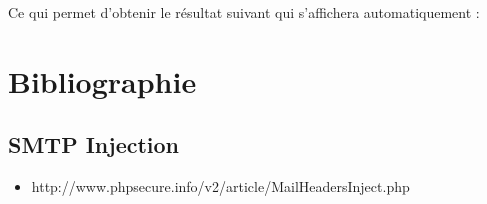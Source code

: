 \documentclass{article}
\begin{document}
Ce qui permet d'obtenir le résultat suivant qui s'affichera automatiquement :
\vspace{0.2cm}\\
\vspace{0.2cm}



\newpage
\section{Bibliographie}
\subsection{SMTP Injection}
\begin{itemize}
\item http://www.phpsecure.info/v2/article/MailHeadersInject.php
\end{itemize}
\end{document}
